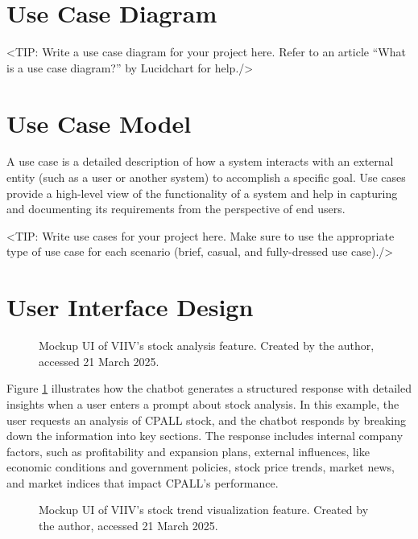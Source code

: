 \section{Use Case Diagram}
\label{section:use-case-diagram}
<TIP: Write a use case diagram for your project here. Refer to an
article “What is a use case diagram?” by Lucidchart for help./>

\section{Use Case Model}
\label{section:use-case-model}
A use case is a detailed description of how a system
interacts with an external entity (such as a user or another system) to
accomplish a specific goal. Use cases provide a high-level view of the
functionality of a system and help in capturing and documenting its
requirements from the perspective of end users.

<TIP: Write use cases for your project here. Make sure to use the
appropriate type of use case for each scenario (brief, casual, and fully-dressed
use case)./>

\section{User Interface Design}
\label{section:user-interface-design}

\begin{figure}[h]
    \centering
    \caption[Mockup UI of VIIV's stock analysis feature]{Mockup UI of VIIV's stock analysis feature. Created by the author, accessed 21 March 2025.}
    \label{fig:viiv-mockup-ui-chat}
\end{figure}

Figure \ref{fig:viiv-mockup-ui-chat} illustrates how the chatbot generates 
a structured response with detailed insights when a user enters a prompt 
about stock analysis. In this example, the user requests an analysis of CPALL stock, 
and the chatbot responds by breaking down the information into key sections. 
The response includes internal company factors, such as profitability and expansion plans, 
external influences, like economic conditions and government policies, stock price trends, 
market news, and market indices that impact CPALL’s performance.

\begin{figure}[h]
    \centering
    \caption[Mockup UI of VIIV's stock trend visualization feature]{Mockup UI of VIIV's stock trend visualization feature. Created by the author, accessed 21 March 2025.}
    \label{fig:viiv-mockup-ui-visualization}
\end{figure}

